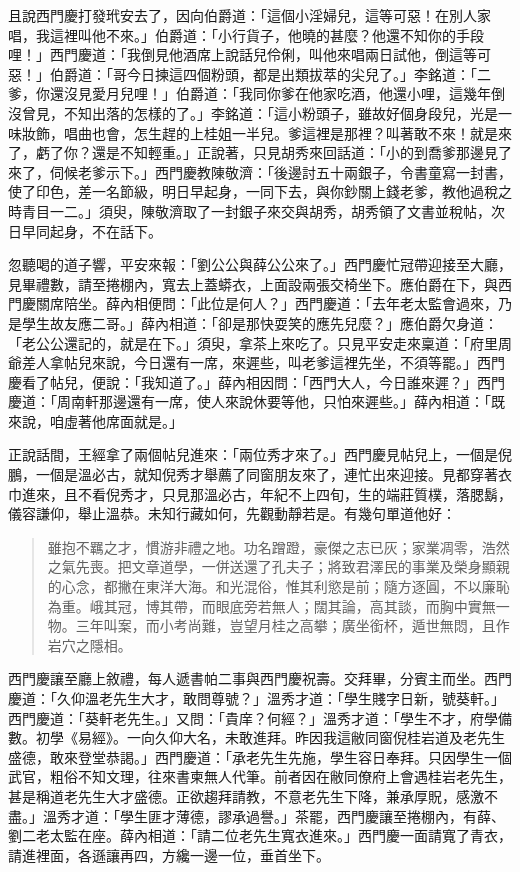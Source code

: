 且說西門慶打發玳安去了，因向伯爵道：「這個小淫婦兒，這等可惡！在別人家唱，我這裡叫他不來。」伯爵道：「小行貨子，他曉的甚麼？他還不知你的手段哩！」西門慶道：「我倒見他酒席上說話兒伶俐，叫他來唱兩日試他，倒這等可惡！」伯爵道：「哥今日揀這四個粉頭，都是出類拔萃的尖兒了。」李銘道：「二爹，你還沒見愛月兒哩！」伯爵道：「我同你爹在他家吃酒，他還小哩，這幾年倒沒曾見，不知出落的怎樣的了。」李銘道：「這小粉頭子，雖故好個身段兒，光是一味妝飾，唱曲也會，怎生趕的上桂姐一半兒。爹這裡是那裡？叫著敢不來！就是來了，虧了你？還是不知輕重。」正說著，只見胡秀來回話道：「小的到喬爹那邊見了來了，伺候老爹示下。」西門慶教陳敬濟：「後邊討五十兩銀子，令書童寫一封書，使了印色，差一名節級，明日早起身，一同下去，與你鈔關上錢老爹，教他過稅之時青目一二。」須臾，陳敬濟取了一封銀子來交與胡秀，胡秀領了文書並稅帖，次日早同起身，不在話下。

忽聽喝的道子響，平安來報：「劉公公與薛公公來了。」西門慶忙冠帶迎接至大廳，見畢禮數，請至捲棚內，寬去上蓋蟒衣，上面設兩張交椅坐下。應伯爵在下，與西門慶關席陪坐。薛內相便問：「此位是何人？」西門慶道：「去年老太監會過來，乃是學生故友應二哥。」薛內相道：「卻是那快耍笑的應先兒麼？」應伯爵欠身道：「老公公還記的，就是在下。」須臾，拿茶上來吃了。只見平安走來稟道：「府里周爺差人拿帖兒來說，今日還有一席，來遲些，叫老爹這裡先坐，不須等罷。」西門慶看了帖兒，便說：「我知道了。」薛內相因問：「西門大人，今日誰來遲？」西門慶道：「周南軒那邊還有一席，使人來說休要等他，只怕來遲些。」薛內相道：「既來說，咱虛著他席面就是。」

正說話間，王經拿了兩個帖兒進來：「兩位秀才來了。」西門慶見帖兒上，一個是倪鵬，一個是溫必古，就知倪秀才舉薦了同窗朋友來了，連忙出來迎接。見都穿著衣巾進來，且不看倪秀才，只見那溫必古，年紀不上四旬，生的端莊質樸，落腮鬍，儀容謙仰，舉止溫恭。未知行藏如何，先觀動靜若是。有幾句單道他好：
\begin{quote}
雖抱不羈之才，慣游非禮之地。功名蹭蹬，豪傑之志已灰；家業凋零，浩然之氣先喪。把文章道學，一併送還了孔夫子；將致君澤民的事業及榮身顯親的心念，都撇在東洋大海。和光混俗，惟其利慾是前；隨方逐圓，不以廉恥為重。峨其冠，博其帶，而眼底旁若無人；闊其論，高其談，而胸中實無一物。三年叫案，而小考尚難，豈望月桂之高攀；廣坐銜杯，遁世無悶，且作岩穴之隱相。
\end{quote}

西門慶讓至廳上敘禮，每人遞書帕二事與西門慶祝壽。交拜畢，分賓主而坐。西門慶道：「久仰溫老先生大才，敢問尊號？」溫秀才道：「學生賤字日新，號葵軒。」西門慶道：「葵軒老先生。」又問：「貴庠？何經？」溫秀才道：「學生不才，府學備數。初學《易經》。一向久仰大名，未敢進拜。昨因我這敝同窗倪桂岩道及老先生盛德，敢來登堂恭謁。」西門慶道：「承老先生先施，學生容日奉拜。只因學生一個武官，粗俗不知文理，往來書柬無人代筆。前者因在敝同僚府上會遇桂岩老先生，甚是稱道老先生大才盛德。正欲趨拜請教，不意老先生下降，兼承厚貺，感激不盡。」溫秀才道：「學生匪才薄德，謬承過譽。」茶罷，西門慶讓至捲棚內，有薛、劉二老太監在座。薛內相道：「請二位老先生寬衣進來。」西門慶一面請寬了青衣，請進裡面，各遜讓再四，方纔一邊一位，垂首坐下。

